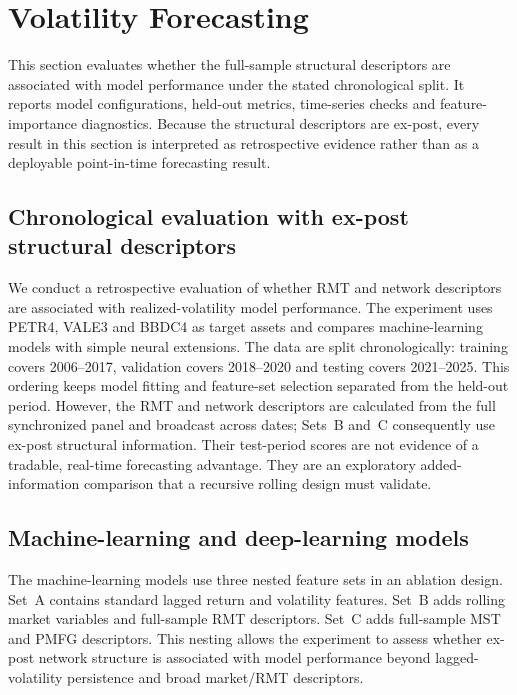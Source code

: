 \clearpage
\section{Volatility Forecasting}
\label{sec:forecasting}

This section evaluates whether the full-sample structural descriptors are associated with model performance under the stated chronological split. It reports model configurations, held-out metrics, time-series checks and feature-importance diagnostics. Because the structural descriptors are ex-post, every result in this section is interpreted as retrospective evidence rather than as a deployable point-in-time forecasting result.

\subsection{Chronological evaluation with ex-post structural descriptors}

We conduct a retrospective evaluation of whether RMT and network descriptors are associated with realized-volatility model performance. The experiment uses PETR4, VALE3 and BBDC4 as target assets and compares machine-learning models with simple neural extensions. The data are split chronologically: training covers 2006--2017, validation covers 2018--2020 and testing covers 2021--2025. This ordering keeps model fitting and feature-set selection separated from the held-out period. However, the RMT and network descriptors are calculated from the full synchronized panel and broadcast across dates; Sets~B and~C consequently use ex-post structural information. Their test-period scores are not evidence of a tradable, real-time forecasting advantage. They are an exploratory added-information comparison that a recursive rolling design must validate.

\subsection{Machine-learning and deep-learning models}

The machine-learning models use three nested feature sets in an ablation design. Set~A contains standard lagged return and volatility features. Set~B adds rolling market variables and full-sample RMT descriptors. Set~C adds full-sample MST and PMFG descriptors. This nesting allows the experiment to assess whether ex-post network structure is associated with model performance beyond lagged-volatility persistence and broad market/RMT descriptors.

